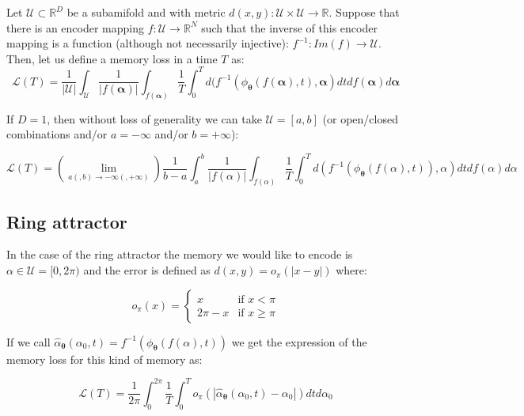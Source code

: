 \documentclass{article} %
\newcounter{ct}
\theoremstyle{definition}
\theoremstyle{remark}
\begin{document}
Let $\mathcal{U}\subset \mathbb{R}^D$ be a subamifold and  with metric $d(x,y): \mathcal{U} \times \mathcal{U} \rightarrow \mathbb{R}$.
Suppose that there is an encoder mapping $f: \mathcal{U} \rightarrow \mathbb{R}^N$ such that the inverse of this encoder mapping is a function (although not necessarily injective): $f^{-1}: Im(f) \rightarrow \mathcal{U}$. 
Then, let us define a memory loss in a time $T$ as:
\begin{equation}
    \mathcal{L}(T) = \frac{1}{|\mathcal{U}|} \int_\mathcal{U}  \frac{1}{|f(\bm{\alpha})|} \int_{f(\bm{\alpha})} \frac{1}{T} \int_0^T d(f^{-1}(\phi_{\bm{\theta}}(f(\bm{\alpha}),t),\bm{\alpha}) dt df(\bm{\alpha}) d\bm{\alpha}
\end{equation}

If $D = 1$, then without loss of generality we can take $\mathcal{U} = [a,b]$ (or open/closed combinations and/or $a = -\infty$ and/or $b = +\infty$):

\begin{equation}
    \mathcal{L}(T) = \left(\lim_{a(,b) \rightarrow -\infty(,+\infty)}\right) \frac{1}{b - a} \int_a^b  \frac{1}{|f(\alpha)|} \int_{f(\alpha)} \frac{1}{T} \int_0^T d(f^{-1}(\phi_{\bm{\theta}}(f(\alpha),t)),\alpha) dt df(\alpha) d\alpha
\end{equation}

\subsection{Ring attractor}

In the case of the ring attractor the memory we would like to encode is $\alpha \in \mathcal{U} = [0,2 \pi)$ and the error is defined as $d(x,y) = o_\pi(|x-y|)$ where:

\begin{equation}
    o_\pi(x) = \begin{cases}
    x & \text{if } x < \pi \\
    2 \pi - x & \text{if } x \geq \pi
    \end{cases}
\end{equation}

If we call $\hat{\alpha}_{\boldsymbol{\theta}}(\alpha_0, t) = f^{-1}(\phi_{\bm{\theta}}(f(\alpha),t))$ we get the expression of the memory loss for this kind of memory as:

\begin{equation}
    \mathcal{L}(T) =  \frac{1}{2 \pi} \int_0^{2 \pi}  \frac{1}{T} \int_0^T o_\pi \left( \left| \hat{\alpha}_{\boldsymbol{\theta}}(\alpha_0, t) - \alpha_0  \right| \right) dt d\alpha_0
\end{equation}
\end{document}
